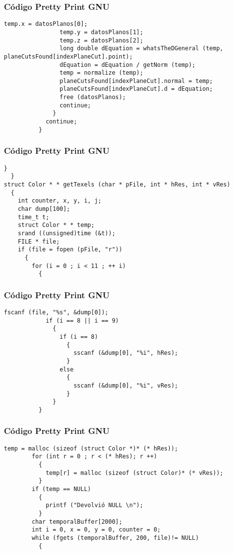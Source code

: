 \documentclass{beamer}
\begin{document}
\begin{frame}[fragile]
\frametitle{C\'odigo Pretty Print GNU}
\begin{lstlisting}[style=CStyle]
                temp.x = datosPlanos[0];
                temp.y = datosPlanos[1];
                temp.z = datosPlanos[2];
                long double dEquation = whatsTheDGeneral (temp, planeCutsFound[indexPlaneCut].point);
                dEquation = dEquation / getNorm (temp);
                temp = normalize (temp);
                planeCutsFound[indexPlaneCut].normal = temp;
                planeCutsFound[indexPlaneCut].d = dEquation;
                free (datosPlanos);
                continue;
              }
            continue;
          }
\end{lstlisting}
\end{frame}
\begin{frame}[fragile]
\frametitle{C\'odigo Pretty Print GNU}
\begin{lstlisting}[style=CStyle]
      }
  }
struct Color * * getTexels (char * pFile, int * hRes, int * vRes)
  {
    int counter, x, y, i, j;
    char dump[100];
    time_t t;
    struct Color * * temp;
    srand ((unsigned)time (&t));
    FILE * file;
    if (file = fopen (pFile, "r"))
      {
        for (i = 0 ; i < 11 ; ++ i)
          {
            \end{lstlisting}
\end{frame}
\begin{frame}[fragile]
\frametitle{C\'odigo Pretty Print GNU}
\begin{lstlisting}[style=CStyle]
            fscanf (file, "%s", &dump[0]);
            if (i == 8 || i == 9)
              {
                if (i == 8)
                  {
                    sscanf (&dump[0], "%i", hRes);
                  }
                else
                  {
                    sscanf (&dump[0], "%i", vRes);
                  }
              }
          }
\end{lstlisting}
\end{frame}
\begin{frame}[fragile]
\frametitle{C\'odigo Pretty Print GNU}
\begin{lstlisting}[style=CStyle]
        temp = malloc (sizeof (struct Color *)* (* hRes));
        for (int r = 0 ; r < (* hRes); r ++)
          {
            temp[r] = malloc (sizeof (struct Color)* (* vRes));
          }
        if (temp == NULL)
          {
            printf ("Devolvió NULL \n");
          }
        char temporalBuffer[2000];
        int i = 0, x = 0, y = 0, counter = 0;
        while (fgets (temporalBuffer, 200, file)!= NULL)
          {
            \end{lstlisting}
\end{frame}
\end{document}
